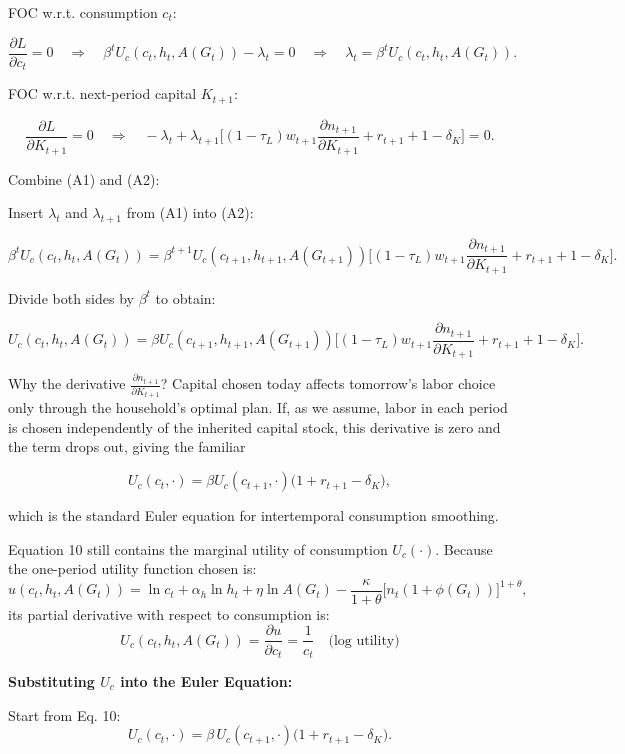 FOC w.r.t. consumption \( c_t \):

\[
\frac{\partial L}{\partial c_t} = 0 \quad \Longrightarrow \quad \beta^t U_c(c_t, h_t, A(G_t)) - \lambda_t = 0 \quad \Longrightarrow \quad \lambda_t = \beta^t U_c(c_t, h_t, A(G_t)). \tag{A1}
\]

FOC w.r.t. next-period capital \( K_{t+1} \):

\[
\frac{\partial L}{\partial K_{t+1}} = 0 \quad \Longrightarrow \quad -\lambda_t + \lambda_{t+1} \Big[(1-\tau_L)w_{t+1} \frac{\partial n_{t+1}}{\partial K_{t+1}} + r_{t+1} + 1 - \delta_K \Big] = 0. \tag{A2}
\]

Combine (A1) and (A2):

Insert \( \lambda_t \) and \( \lambda_{t+1} \) from (A1) into (A2):

\[
\beta^t U_c(c_t, h_t, A(G_t)) = \beta^{t+1} U_c(c_{t+1}, h_{t+1}, A(G_{t+1})) \Big[(1-\tau_L)w_{t+1} \frac{\partial n_{t+1}}{\partial K_{t+1}} + r_{t+1} + 1 - \delta_K \Big].
\]

Divide both sides by \( \beta^t \) to obtain:

\[
U_c(c_t, h_t, A(G_t)) = \beta U_c(c_{t+1}, h_{t+1}, A(G_{t+1})) \Big[(1-\tau_L)w_{t+1} \frac{\partial n_{t+1}}{\partial K_{t+1}} + r_{t+1} + 1 - \delta_K \Big].
\]

Why the derivative \( \frac{\partial n_{t+1}}{\partial K_{t+1}} \)? Capital chosen today affects tomorrow’s labor choice only through the household’s optimal plan. If, as we assume, labor in each period is chosen independently of the inherited capital stock, this derivative is zero and the term drops out, giving the familiar

\[
U_c(c_t, \cdot) = \beta U_c(c_{t+1}, \cdot) \bigl(1 + r_{t+1} - \delta_K\bigr),
\]

which is the standard Euler equation for intertemporal consumption smoothing.

\noindent Equation 10 still contains the marginal utility of consumption \(U_c(\cdot)\). Because the one-period utility function chosen is:
\[
u(c_t, h_t, A(G_t)) = \ln c_t + \alpha_h \ln h_t + \eta \ln A(G_t) - \frac{\kappa}{1+\theta}\bigl[n_t(1+\phi(G_t))\bigr]^{1+\theta}, \tag{6}
\]
its partial derivative with respect to consumption is:
\[
U_c(c_t, h_t, A(G_t)) = \frac{\partial u}{\partial c_t} = \frac{1}{c_t} \quad\text{(log utility)}
\]

{\bf Substituting \(U_c\) into the Euler Equation:}

Start from Eq. 10:
\[
U_c(c_t,\cdot) = \beta\,U_c(c_{t+1},\cdot)\bigl(1 + r_{t+1} - \delta_K\bigr). \tag{10}
\]

